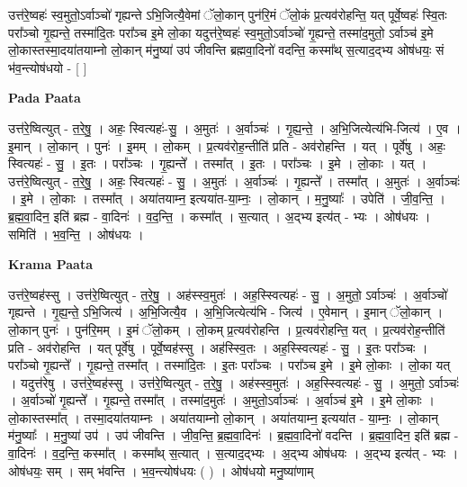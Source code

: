 \documentclass[17pt]{extarticle}
\begin{document}
उत्त॑रे॒ष्वहः॑ स्व॒मुतो॒ऽर्वाञ्चो॑ गृह्यन्ते ऽभि॒जित्यै॒वेमां ॅलो॒कान् पुन॑रि॒मं ॅलो॒कं प्र॒त्यव॑रोहन्ति॒ यत् पूर्वे॒ष्वहः॑ स्वि॒तः परा᳚ञ्चो गृ॒ह्यन्ते॒ तस्मा॑दि॒तः परा᳚ञ्च इ॒मे लो॒का यदुत्त॑रे॒ष्वहः॑ स्व॒मुतो॒ऽर्वाञ्चो॑ गृ॒ह्यन्ते॒ तस्मा॑द॒मुतो॒ ऽर्वाञ्च॑ इ॒मे लो॒कास्तस्मा॒दया॑तयाम्नो लो॒कान् म॑नु॒ष्या॑ उप॑ जीवन्ति ब्रह्मवा॒दिनो॑ वदन्ति॒ कस्मा᳚थ् स॒त्याद॒द्भ्य ओष॑धयः॒ सं भ॑व॒न्त्योष॑धयो - [  ] \newline

\textbf{Pada Paata} \newline

उत्त॑रे॒ष्वित्युत् - त॒रे॒षु॒ । अहः॒ स्वित्यहः॑-सु॒ । अ॒मुतः॑ । अ॒र्वाञ्चः॑ । गृ॒ह्य॒न्ते॒ । अ॒भि॒जित्येत्य॑भि-जित्य॑ । ए॒व । इ॒मान् । लो॒कान् । पुनः॑ । इ॒मम् । लो॒कम् । प्र॒त्यव॑रोह॒न्तीति॑ प्रति - अव॑रोहन्ति । यत् । पूर्वे॑षु । अहः॒ स्वित्यहः॑ - सु॒ । इ॒तः । परा᳚ञ्चः । गृ॒ह्यन्ते᳚ । तस्मा᳚त् । इ॒तः । परा᳚ञ्चः । इ॒मे । लो॒काः । यत् । उत्त॑रे॒ष्वित्युत् - त॒रे॒षु॒ । अहः॒ स्वित्यहः॑ - सु॒ । अ॒मुतः॑ । अ॒र्वाञ्चः॑ । गृ॒ह्यन्ते᳚ । तस्मा᳚त् । अ॒मुतः॑ । अ॒र्वाञ्चः॑ । इ॒मे । लो॒काः । तस्मा᳚त् । अया॑तयाम्न॒ इत्यया॑त-या॒म्नः॒ । लो॒कान् । म॒नु॒ष्याः᳚ । उपेति॑ । जी॒व॒न्ति॒ । ब्र॒ह्म॒वा॒दिन॒ इति॑ ब्रह्म - वा॒दिनः॑ । व॒द॒न्ति॒ । कस्मा᳚त् । स॒त्यात् । अ॒द्भ्य इत्य॑त् - भ्यः । ओष॑धयः । समिति॑ । भ॒व॒न्ति॒ । ओष॑धयः ।  \newline


\textbf{Krama Paata} \newline

उत्त॑रे॒ष्वह॑स्सु । उत्त॑रे॒ष्वित्युत् - त॒रे॒षु॒ । अह॑स्स्व॒मुतः॑ । अह॒स्स्वित्यहः॑ - सु॒ । अ॒मुतो॒ ऽर्वाञ्चः॑ । अ॒र्वाञ्चो॑ गृह्यन्ते । गृ॒ह्य॒न्ते॒ ऽभि॒जित्य॑ । अ॒भि॒जित्यै॒व । अ॒भि॒जित्येत्य॑भि - जित्य॑ । ए॒वेमान् । इ॒मान् ॅलो॒कान् । लो॒कान् पुनः॑ । पुन॑रि॒मम् । इ॒मं ॅलो॒कम् । लो॒कम् प्र॒त्यव॑रोहन्ति । प्र॒त्यव॑रोहन्ति॒ यत् । प्र॒त्यव॑रोह॒न्तीति॑ प्रति - अव॑रोहन्ति । यत् पूर्वे॑षु । पूर्वे॒ष्वह॑स्सु । अह॑स्स्वि॒तः । अह॒स्स्वित्यहः॑ - सु॒ । इ॒तः परा᳚ञ्चः । परा᳚ञ्चो गृ॒ह्यन्ते᳚ । गृ॒ह्यन्ते॒ तस्मा᳚त् । तस्मा॑दि॒तः । इ॒तः परा᳚ञ्चः । परा᳚ञ्च इ॒मे । इ॒मे लो॒काः । लो॒का यत् । यदुत्त॑रेषु । उत्त॑रे॒ष्वह॑स्सु । उत्त॑रे॒ष्वित्युत् - त॒रे॒षु॒ । अह॑स्स्व॒मुतः॑ । अह॒स्स्वित्यहः॑ - सु॒ । अ॒मुतो॒ ऽर्वाञ्चः॑ । अ॒र्वाञ्चो॑ गृ॒ह्यन्ते᳚ । गृ॒ह्यन्ते॒ तस्मा᳚त् । तस्मा॑द॒मुतः॑ । अ॒मुतो॒ऽर्वाञ्चः॑ । अ॒र्वाञ्च॑ इ॒मे । इ॒मे लो॒काः । लो॒कास्तस्मा᳚त् । तस्मा॒दया॑तयाम्नः । अया॑तयाम्नो लो॒कान् । अया॑तयाम्न॒ इत्यया॑त - या॒म्नः॒ । लो॒कान् म॑नु॒ष्याः᳚ । म॒नु॒ष्या॑ उप॑ । उप॑ जीवन्ति । जी॒व॒न्ति॒ ब्र॒ह्म॒वा॒दिनः॑ । ब्र॒ह्म॒वा॒दिनो॑ वदन्ति । ब्र॒ह्म॒वा॒दिन॒ इति॑ ब्रह्म - वा॒दिनः॑ । व॒द॒न्ति॒ कस्मा᳚त् । कस्मा᳚थ् स॒त्यात् । स॒त्याद॒द्भ्यः । अ॒द्भ्य ओष॑धयः । अ॒द्भ्य इत्य॑त् - भ्यः । ओष॑धयः॒ सम् । सम् भ॑वन्ति । भ॒व॒न्त्योष॑धयः ( ) । ओष॑धयो मनु॒ष्या॑णाम् \newline
\end{document}
